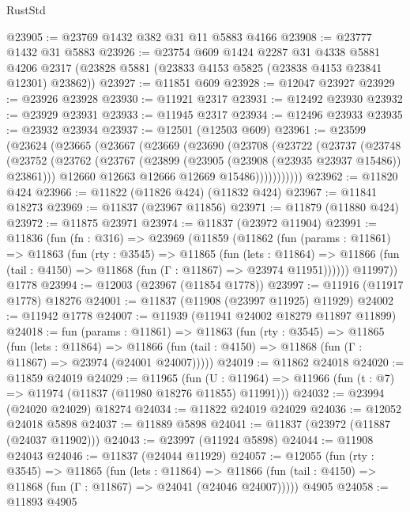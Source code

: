 \begin{lexlean}{RustStd}
\begin{coremodule}
{\begin{coremodule}
{{{{{{{{{{{{{{{{{{{{{{{{{{{{{{{{{{{{{{{{{{{{{{{{{{@23905 := @23769 @1432 @382 @31 @11 @5883 @4166
@23908 := @23777 @1432 @31 @5883
@23926 := @23754
    @609
    @1424
    @2287
    @31
    @4338
    @5881
    @4206
    @2317
    (@23828 @5881 (@23833 @4153 @5825 (@23838 @4153 @23841 @12301) @23862))
@23927 := @11851 @609
@23928 := @12047 @23927
@23929 := @23926 @23928
@23930 := @11921 @2317
@23931 := @12492 @23930
@23932 := @23929 @23931
@23933 := @11945 @2317
@23934 := @12496 @23933
@23935 := @23932 @23934
@23937 := @12501 (@12503 @609)
@23961 := @23599
    (@23624
      (@23665
        (@23667
          (@23669
            (@23690
              (@23708
                (@23722
                  (@23737
                    (@23748
                      (@23752
                        (@23762
                          (@23767 (@23899 (@23905 (@23908 (@23935 @23937 @15486)) @23861)))
                          @12660
                          @12663
                          @12666
                          @12669
                          @15486)))))))))))
@23962 := @11820 @424
@23966 := @11822 (@11826 @424) (@11832 @424)
@23967 := @11841 @18273
@23969 := @11837 (@23967 @11856)
@23971 := @11879 (@11880 @424)
@23972 := @11875 @23971
@23974 := @11837 (@23972 @11904)
@23991 := @11836
    (fun (fn : @316) =>
    @23969
      (@11859
        (@11862
          (fun (params : @11861) =>
          @11863
            (fun (rty : @3545) =>
            @11865
              (fun (lets : @11864) =>
              @11866 (fun (tail : @4150) => @11868 (fun (Γ : @11867) => @23974 @11951))))))
        @11997))
    @1778
@23994 := @12003 (@23967 (@11854 @1778))
@23997 := @11916 (@11917 @1778) @18276
@24001 := @11837 (@11908 (@23997 @11925) @11929)
@24002 := @11942 @1778
@24007 := @11939 (@11941 @24002 @18279 @11897 @11899)
@24018 := fun (params : @11861) =>
  @11863
    (fun (rty : @3545) =>
    @11865
      (fun (lets : @11864) =>
      @11866 (fun (tail : @4150) => @11868 (fun (Γ : @11867) => @23974 (@24001 @24007)))))
@24019 := @11862 @24018
@24020 := @11859 @24019
@24029 := @11965
    (fun (U : @11964) => @11966 (fun (t : @7) => @11974 (@11837 (@11980 @18276 @11855) @11991)))
@24032 := @23994 (@24020 @24029) @18274
@24034 := @11822 @24019 @24029
@24036 := @12052 @24018 @5898
@24037 := @11889 @5898
@24041 := @11837 (@23972 (@11887 (@24037 @11902)))
@24043 := @23997 (@11924 @5898)
@24044 := @11908 @24043
@24046 := @11837 (@24044 @11929)
@24057 := @12055
    (fun (rty : @3545) =>
    @11865
      (fun (lets : @11864) =>
      @11866 (fun (tail : @4150) => @11868 (fun (Γ : @11867) => @24041 (@24046 @24007)))))
    @4905
@24058 := @11893 @4905
}}}}}}}}}}}}}}}}}}}}}}}}}}}}}}}}}}}}}}}}}}}}}}}}}}
\end{coremodule}}
\end{coremodule}
\end{lexlean}
